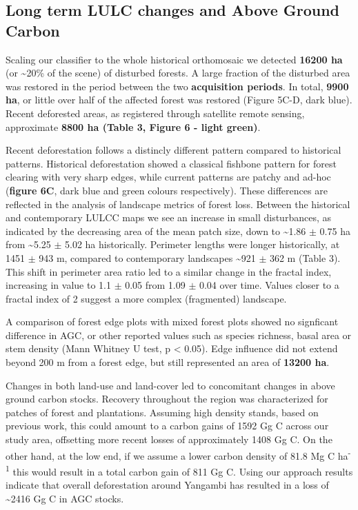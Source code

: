 \documentclass[remote sensing,article,submit,moreauthors,pdftex]{mdpi}
\begin{document}
\hypertarget{long-term-lulc-changes-and-above-ground-carbon}{%
\subsection{Long term LULC changes and Above Ground
Carbon}\label{long-term-lulc-changes-and-above-ground-carbon}}

Scaling our classifier to the whole historical orthomosaic we detected
\textbf{16200 ha} (or \textasciitilde{}20\% of the scene) of disturbed
forests. A large fraction of the disturbed area was restored in the
period between the two \textbf{acquisition periods}. In total,
\textbf{9900 ha}, or little over half of the affected forest was
restored (Figure 5C-D, dark blue). Recent deforested areas, as
registered through satellite remote sensing, approximate \textbf{8800 ha
(Table 3, Figure 6 - light green)}.

Recent deforestation follows a distincly different pattern compared to
historical patterns. Historical deforestation showed a classical
fishbone pattern for forest clearing with very sharp edges, while
current patterns are patchy and ad-hoc (\textbf{figure 6C}, dark blue
and green colours respectively). These differences are reflected in the
analysis of landscape metrics of forest loss. Between the historical and
contemporary LULCC maps we see an increase in small disturbances, as
indicated by the decreasing area of the mean patch size, down to
\textasciitilde{}1.86 \(\pm\) 0.75 ha from \textasciitilde{}5.25 \(\pm\)
5.02 ha historically. Perimeter lengths were longer historically, at
1451 \(\pm\) 943 m, compared to contemporary landscapes
\textasciitilde{}921 \(\pm\) 362 m (Table 3). This shift in perimeter
area ratio led to a similar change in the fractal index, increasing in
value to 1.1 \(\pm\) 0.05 from 1.09 \(\pm\) 0.04 over time. Values
closer to a fractal index of 2 suggest a more complex (fragmented)
landscape.

A comparison of forest edge plots with mixed forest plots showed no
signficant difference in AGC, or other reported values such as species
richness, basal area or stem density (Mann Whitney U test, p \textless{}
0.05). Edge influence did not extend beyond 200 m from a forest edge,
but still represented an area of \textbf{13200 ha}.

Changes in both land-use and land-cover led to concomitant changes in
above ground carbon stocks. Recovery throughout the region was
characterized for patches of forest and plantations. Assuming high
density stands, based on previous work, this could amount to a carbon
gains of 1592 Gg C across our study area, offsetting more recent losses
of approximately 1408 Gg C. On the other hand, at the low end, if we
assume a lower carbon density of 81.8 Mg C ha\textsuperscript{-1} this
would result in a total carbon gain of 811 Gg C. Using our approach
results indicate that overall deforestation around Yangambi has resulted
in a loss of \textasciitilde{}2416 Gg C in AGC stocks.
\end{document}
